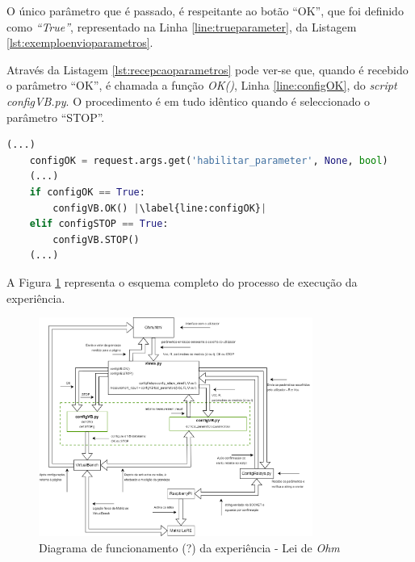 O único parâmetro que é passado, é respeitante ao botão ``OK'', que foi definido como \textit{``True''}, representado na Linha \ref{line:trueparameter}, da Listagem \ref{lst:exemploenvioparametros}.

Através da Listagem \ref{lst:recepcaoparametros} pode ver-se que, quando é recebido o parâmetro ``OK'', é chamada a função \textit{OK()}, Linha \ref{line:configOK}, do \textit{script} \textit{configVB.py}. O procedimento é em tudo idêntico quando é seleccionado o parâmetro ``STOP''.

\begin{minipage}{0.9\linewidth}
	\begin{lstlisting}[language=python, escapechar=|, caption=Teste do parâmetro ``OK'' (\ldots e ``STOP'') no ficheiro \textit{views.py}, label=lst:recepcaoparametros]
	(...)
	configOK = request.args.get('habilitar_parameter', None, bool)
	(...)
	if configOK == True:
        configVB.OK() |\label{line:configOK}|  
    elif configSTOP == True:
        configVB.STOP()	
	(...)
	\end{lstlisting}
\end{minipage}


A Figura \ref{fig:experiencialeiohm} representa o esquema completo do processo de execução da experiência. 

\begin{figure}[hbtp]
	\centering
	\includegraphics[width=0.8\textwidth]{figures/ohm_diagrama.drawio.png}
	\caption{Diagrama de funcionamento (?) da experiência - Lei de \textit{Ohm}}
	\label{fig:experiencialeiohm}
\end{figure}

